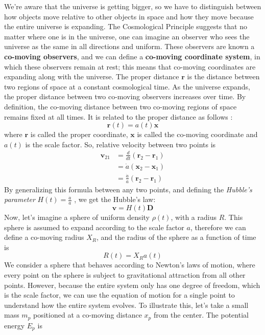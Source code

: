 \documentclass[12pt]{article}
\begin{document}
We're aware that the universe is getting bigger, so we have to distinguish between how objects move relative to other objects in space and how they move because the entire universe is expanding. The Cosmological Principle suggests that no matter where one is in the universe, one can imagine an observer who sees the universe as the same in all directions and uniform. These observers are known a \textbf{co-moving observers}, and we can define a \textbf{co-moving coordinate system}, in which these observers remain at rest; this means that co-moving coordinates are expanding along with the universe. The proper distance $\mathbf{r}$ is the distance between two regions of space at a constant cosmological time. As the universe expands, the proper distance between two co-moving observers increases over time.  By definition, the co-moving distance between two co-moving regions of space remains fixed at all times. It is related to the proper distance as follows : 
\begin{equation}
\mathbf{r}(t)=a(t) \mathbf{x}
\end{equation}
where $\mathbf{r}$ is called the proper coordinate, $\mathbf{x}$ is called the co-moving coordinate and $a(t)$ is the scale factor. So, relative velocity between two points is
\begin{equation*}
\begin{aligned} 
\mathbf{v}_{21} &=\frac{d}{d t}\left(\mathbf{r}_{2}-\mathbf{r}_{1}\right) \\ &=\dot{a}\left(\mathbf{x}_{2}-\mathbf{x}_{1}\right) \\ &=\frac{\dot{a}}{a}\left(\mathbf{r}_{2}-\mathbf{r}_{1}\right) 
\end{aligned}
\end{equation*} 
By generalizing this formula between any two points, and defining the \textit{Hubble’s parameter} $H(t)=\frac{\dot{a}}{a}$ , we get the Hubble's law:
\begin{equation}
\mathbf{v}=H(t) \mathbf{D}
\end{equation}
Now, let's imagine a sphere of uniform density $\rho(t)$, with a radius $R$. This sphere is assumed to expand according to the scale factor $a$, therefore we can define a co-moving radius $X_{R}$, and the radius of the sphere as a function of time is
\begin{equation}
R(t)=X_{R} a(t)
\end{equation}
We consider a sphere that behaves according to Newton's laws of motion, where every point on the sphere is subject to gravitational attraction from all other points. However, because the entire system only has one degree of freedom, which is the scale factor, we can use the equation of motion for a single point to understand how the entire system evolves. To illustrate this, let's take a small mass $m_{p}$ positioned at a co-moving distance $x_{p}$ from the center. The potential energy $E_{p}$ is
\end{document}
